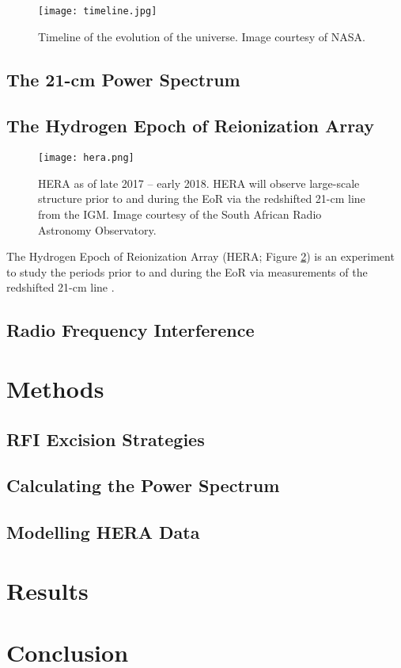 \documentclass[12pt]{article}
\begin{document}
\begin{figure}[tb]
	\centering
	\texttt{[image: timeline.jpg]}
	\caption[Timeline of the universe]{Timeline of the evolution of the universe. Image courtesy of NASA.}
	\label{fig:timeline}
\end{figure}

\cite{furlanetto2006}

\cite{morales2010}

\cite{pritchard2012}

\subsection{The 21-cm Power Spectrum} \label{subsec:ps}
\subsection{The Hydrogen Epoch of Reionization Array} \label{subsec:hera}
\begin{figure}[tb]
	\centering
	\texttt{[image: hera.png]}
	\caption[HERA as of late 2017 -- early 2018]{HERA as of late 2017 -- early 2018. HERA will observe large-scale structure prior to and during the EoR via the redshifted 21-cm line from the IGM. Image courtesy of the South African Radio Astronomy Observatory.}
	\label{fig:hera}
\end{figure}

The Hydrogen Epoch of Reionization Array (HERA; Figure \ref{fig:hera}) is an experiment to study the periods prior to and during the EoR  via measurements of the redshifted 21-cm line \citep{deboer2017}.
\subsection{Radio Frequency Interference} \label{subsec:rfi}

\section{Methods} \label{sec:methods}
\subsection{RFI Excision Strategies} \label{subsec:rfi_excision}
\subsection{Calculating the Power Spectrum} \label{subsec:calc_ps}
\subsection{Modelling HERA Data} \label{subsec:modelling}

\section{Results}

\section{Conclusion}



\end{document}

